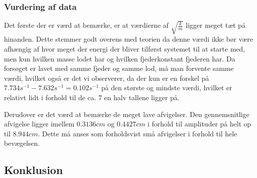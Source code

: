 \subsubsection{Vurdering af data}\label{exp1: Vurdering af data}
Det første der er værd at bemærke, er at værdierne af $\sqrt{\frac{k}{m}}$ ligger meget tæt på hinanden. 
Dette stemmer godt overens med teorien da denne værdi ikke bør være afhængig af hvor meget der energi der bliver tilførst systemet til at starte med, men kun hvilken masse lodet har og hvilken fjederkonstant fjederen har. 
Da forsøget er lavet med samme fjeder og samme lod, må man forvente samme værdi, hvilket også er det vi observerer, da der kun er en forskel på $7.734s^{-1}-7.632s^{-1}=0.102s^{-1}$ på den største og mindste værdi, hvilket er relativt lidt i forhold til de ca. 7 en halv tallene ligger på.



Derudover er det værd at bemærke de meget lave afvigelser. 
Den gennemsnitlige afvigelse ligger imellem $0.3136cm$ og $0.4427cm$ i forhold til amplituder på helt op til $8.944cm$. 
Dette må anses som forholdsvist små afvigelser i forhold til hele bevægelsen.


\subsection{Konklusion}


